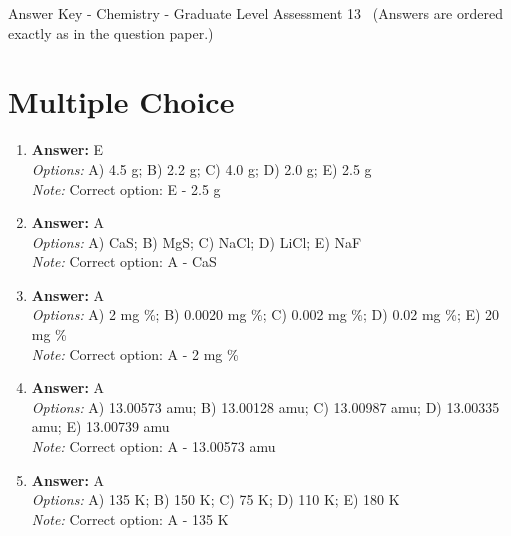 \documentclass[12pt]{article}
\begin{document}
\begin{center}
Answer Key - Chemistry - Graduate Level Assessment 13 \
\small (Answers are ordered exactly as in the question paper.)
\end{center}

\section*{Multiple Choice}
\begin{enumerate}[label=\arabic*.]
\item \textbf{Answer:} E
\\ \textit{Options:} A) 4.5 g; B) 2.2 g; C) 4.0 g; D) 2.0 g; E) 2.5 g
\\ \textit{Note:} Correct option: E - 2.5 g
\item \textbf{Answer:} A
\\ \textit{Options:} A) CaS; B) MgS; C) NaCl; D) LiCl; E) NaF
\\ \textit{Note:} Correct option: A - CaS
\item \textbf{Answer:} A
\\ \textit{Options:} A) 2 mg \%; B) 0.0020 mg \%; C) 0.002 mg \%; D) 0.02 mg \%; E) 20 mg \%
\\ \textit{Note:} Correct option: A - 2 mg \%
\item \textbf{Answer:} A
\\ \textit{Options:} A) 13.00573 amu; B) 13.00128 amu; C) 13.00987 amu; D) 13.00335 amu; E) 13.00739 amu
\\ \textit{Note:} Correct option: A - 13.00573 amu
\item \textbf{Answer:} A
\\ \textit{Options:} A) 135 K; B) 150 K; C) 75 K; D) 110 K; E) 180 K
\\ \textit{Note:} Correct option: A - 135 K
\end{enumerate}
\end{document}
